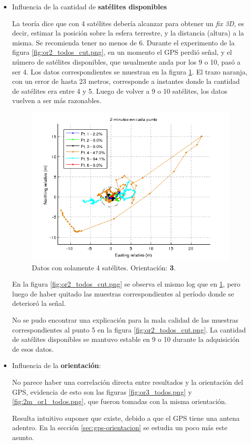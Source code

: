 \documentclass[spanish,12pt,a4paper,titlepage]{report}
\begin{document}
\begin{itemize}
\item Influencia de la cantidad de \textbf{satélites disponibles}

La teoría dice que con 4 satélites debería alcanzar para obtener un \textit{fix 3D}, es decir, estimar la posición sobre la esfera terrestre, y la distancia (altura) a la misma. Se recomienda tener no menos de 6. Durante el experimento de la figura \ref{fig:or2_todos_cut.png}, en un momento el GPS perdió señal, y el número de satélites disponibles, que usualmente anda por los 9 o 10, pasó a ser 4. Los datos correspondientes se muestran en la figura \ref{fig:or2_todos_sat_mal.png}. El trazo naranja, con un error de hasta 23 metros, corresponde a instantes donde la cantidad de satélites era entre 4 y 5. Luego de volver a 9 o 10 satélites, los datos vuelven a ser más razonables.

\begin{figure}[h!]
  \includegraphics[width=1\textwidth]{./img/or2_todos_sat_mal.png}
  \caption{Datos con solamente 4 satélites. Orientación: \textbf{3}.}
  \label{fig:or2_todos_sat_mal.png}
\end{figure}

En la figura \ref{fig:or2_todos_cut.png} se observa el mismo log que en \ref{fig:or2_todos_sat_mal.png}, pero luego de haber quitado las muestras correspondientes al período donde se deterioró la señal.

No se pudo encontrar una explicación para la mala calidad de las muestras correspondientes al punto 5 en la figura \ref{fig:or2_todos_cut.png}. La cantidad de satélites disponibles se mantuvo estable en 9 o 10 durante la adquisición de esos datos.
\item Influencia de la \textbf{orientación}:

No parece haber una correlación directa entre resultados y la orientación del GPS, evidencia de esto son las figuras \ref{fig:or3_todos.png} y \ref{fig:2m_or1_todos.png}, que fueron tomadas con la misma orientación.

Resulta  intuitivo suponer que existe, debido a que el GPS tiene una antena adentro. En la sección \ref{sec:gps-orientacion} se estudia un poco más este asunto.
\end{itemize}
\end{document}
